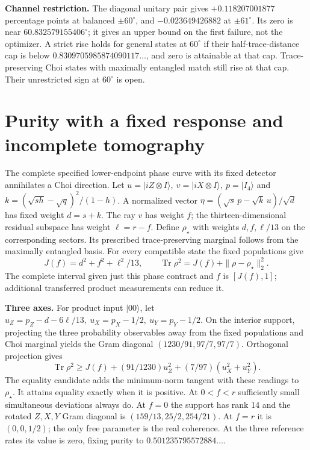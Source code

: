 \documentclass[
  10pt,
  a4paper,
]{article}
\begin{document}
\textbf{Channel restriction.} The diagonal unitary pair gives \(+0.118207001877\) percentage points at balanced \(\pm60^\circ\), and \(-0.023649426882\) at \(\pm61^\circ\). Its zero is near \(60.832579155406^\circ\); it gives an upper bound on the first failure, not the optimizer. A strict rise holds for general states at \(60^\circ\) if their half-trace-distance cap is below \(0.8309705985874090117\ldots\), and zero is attainable at that cap. Trace-preserving Choi states with maximally entangled match still rise at that cap. Their unrestricted sign at \(60^\circ\) is open.

\newpage

\section{Purity with a fixed response and incomplete tomography}\label{purity-with-a-fixed-response-and-incomplete-tomography}

The complete specified lower-endpoint phase curve with its fixed detector annihilates a Choi direction. Let \(u=|iZ\otimes I\rangle,\ v=|iX\otimes I\rangle,\ p=|I_4\rangle\) and \(k=(\sqrt{sh}-\sqrt q)^2/(1-h)\). A normalized vector \(\eta=(\sqrt s\,p-\sqrt k\,u)/\sqrt d\) has fixed weight \(d=s+k\). The ray \(v\) has weight \(f\); the thirteen-dimensional residual subspace has weight \(\ell=r-f\). Define \(\rho_\star\) with weights \(d,f,\ell/13\) on the corresponding sectors. Its prescribed trace-preserving marginal follows from the maximally entangled basis. For every compatible state the fixed populations give \[
 J(f)=d^2+f^2+\ell^2/13,\qquad
 \operatorname{Tr}\rho^2=J(f)+\|\rho-\rho_\star\|_2^2 .
\] The complete interval given just this phase contract and \(f\) is \([J(f),1]\); additional transferred product measurements can reduce it.

\textbf{Three axes.} For product input \(|00\rangle\), let \(u_Z=p_Z-d-6\ell/13,\ u_X=p_X-1/2,\ u_Y=p_Y-1/2\). On the interior support, projecting the three probability observables away from the fixed populations and Choi marginal yields the Gram diagonal \((1230/91,97/7,97/7)\). Orthogonal projection gives \[
 \operatorname{Tr}\rho^2\ge J(f)+(91/1230)u_Z^2+(7/97)(u_X^2+u_Y^2).
\] The equality candidate adds the minimum-norm tangent with these readings to \(\rho_\star\). It attains equality exactly when it is positive. At \(0<f<r\) sufficiently small simultaneous deviations always do. At \(f=0\) the support has rank 14 and the rotated \(Z,X,Y\) Gram diagonal is \((159/13,25/2,254/21)\). At \(f=r\) it is \((0,0,1/2)\); the only free parameter is the real coherence. At the three reference rates its value is zero, fixing purity to \(0.501235795572884\ldots\).
\end{document}
